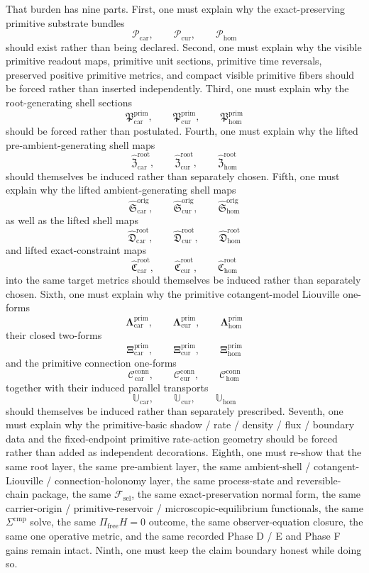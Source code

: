 \documentclass[11pt]{article}
\newcommand{\StemFunctional}{\mathscr F_{\mathrm{sel}}}
\newcommand{\TensorPrimitiveSpace}{\mathcal P_{\mathrm{car}}}
\newcommand{\CurPrimitiveSpace}{\mathcal P_{\mathrm{cur}}}
\newcommand{\HomPrimitiveSpace}{\mathcal P_{\mathrm{hom}}}
\newcommand{\TensorPrimitiveSection}{\mathfrak P_{\mathrm{car}}^{\mathrm{prim}}}
\newcommand{\CurPrimitiveSection}{\mathfrak P_{\mathrm{cur}}^{\mathrm{prim}}}
\newcommand{\HomPrimitiveSection}{\mathfrak P_{\mathrm{hom}}^{\mathrm{prim}}}
\newcommand{\TensorPrimitiveLiftedPreAmbientSection}{\widehat{\mathfrak Z}_{\mathrm{car}}^{\mathrm{root}}}
\newcommand{\CurPrimitiveLiftedPreAmbientSection}{\widehat{\mathfrak Z}_{\mathrm{cur}}^{\mathrm{root}}}
\newcommand{\HomPrimitiveLiftedPreAmbientSection}{\widehat{\mathfrak Z}_{\mathrm{hom}}^{\mathrm{root}}}
\newcommand{\TensorPrimitiveLiftedAmbientSection}{\widehat{\mathfrak S}_{\mathrm{car}}^{\mathrm{orig}}}
\newcommand{\CurPrimitiveLiftedAmbientSection}{\widehat{\mathfrak S}_{\mathrm{cur}}^{\mathrm{orig}}}
\newcommand{\HomPrimitiveLiftedAmbientSection}{\widehat{\mathfrak S}_{\mathrm{hom}}^{\mathrm{orig}}}
\newcommand{\TensorPrimitiveLiftedShellSection}{\widehat{\mathfrak D}_{\mathrm{car}}^{\mathrm{root}}}
\newcommand{\CurPrimitiveLiftedShellSection}{\widehat{\mathfrak D}_{\mathrm{cur}}^{\mathrm{root}}}
\newcommand{\HomPrimitiveLiftedShellSection}{\widehat{\mathfrak D}_{\mathrm{hom}}^{\mathrm{root}}}
\newcommand{\TensorPrimitiveConstraintMap}{\widehat{\mathfrak C}_{\mathrm{car}}^{\mathrm{root}}}
\newcommand{\CurPrimitiveConstraintMap}{\widehat{\mathfrak C}_{\mathrm{cur}}^{\mathrm{root}}}
\newcommand{\HomPrimitiveConstraintMap}{\widehat{\mathfrak C}_{\mathrm{hom}}^{\mathrm{root}}}
\newcommand{\TensorPrimitiveLiouville}{\boldsymbol{\Lambda}_{\mathrm{car}}^{\mathrm{prim}}}
\newcommand{\CurPrimitiveLiouville}{\boldsymbol{\Lambda}_{\mathrm{cur}}^{\mathrm{prim}}}
\newcommand{\HomPrimitiveLiouville}{\boldsymbol{\Lambda}_{\mathrm{hom}}^{\mathrm{prim}}}
\newcommand{\TensorPrimitiveTwo}{\boldsymbol{\Xi}_{\mathrm{car}}^{\mathrm{prim}}}
\newcommand{\CurPrimitiveTwo}{\boldsymbol{\Xi}_{\mathrm{cur}}^{\mathrm{prim}}}
\newcommand{\HomPrimitiveTwo}{\boldsymbol{\Xi}_{\mathrm{hom}}^{\mathrm{prim}}}
\newcommand{\TensorPrimitiveConnectionForm}{\mathcal C_{\mathrm{car}}^{\mathrm{conn}}}
\newcommand{\CurPrimitiveConnectionForm}{\mathcal C_{\mathrm{cur}}^{\mathrm{conn}}}
\newcommand{\HomPrimitiveConnectionForm}{\mathcal C_{\mathrm{hom}}^{\mathrm{conn}}}
\newcommand{\TensorPrimitiveTransport}{\mathbb U_{\mathrm{car}}}
\newcommand{\CurPrimitiveTransport}{\mathbb U_{\mathrm{cur}}}
\newcommand{\HomPrimitiveTransport}{\mathbb U_{\mathrm{hom}}}
\begin{document}
That burden has nine parts. First, one must explain why the exact-preserving primitive substrate bundles
\[
\TensorPrimitiveSpace,\qquad
\CurPrimitiveSpace,\qquad
\HomPrimitiveSpace
\]
should exist rather than being declared. Second, one must explain why the visible primitive readout maps, primitive unit sections, primitive time reversals, preserved positive primitive metrics, and compact visible primitive fibers should be forced rather than inserted independently. Third, one must explain why the root-generating shell sections
\[
\TensorPrimitiveSection,\qquad
\CurPrimitiveSection,\qquad
\HomPrimitiveSection
\]
should be forced rather than postulated. Fourth, one must explain why the lifted pre-ambient-generating shell maps
\[
\TensorPrimitiveLiftedPreAmbientSection,\qquad
\CurPrimitiveLiftedPreAmbientSection,\qquad
\HomPrimitiveLiftedPreAmbientSection
\]
should themselves be induced rather than separately chosen. Fifth, one must explain why the lifted ambient-generating shell maps
\[
\TensorPrimitiveLiftedAmbientSection,\qquad
\CurPrimitiveLiftedAmbientSection,\qquad
\HomPrimitiveLiftedAmbientSection
\]
as well as the lifted shell maps
\[
\TensorPrimitiveLiftedShellSection,\qquad
\CurPrimitiveLiftedShellSection,\qquad
\HomPrimitiveLiftedShellSection
\]
and lifted exact-constraint maps
\[
\TensorPrimitiveConstraintMap,\qquad
\CurPrimitiveConstraintMap,\qquad
\HomPrimitiveConstraintMap
\]
into the same target metrics should themselves be induced rather than separately chosen. Sixth, one must explain why the primitive cotangent-model Liouville one-forms
\[
\TensorPrimitiveLiouville,\qquad
\CurPrimitiveLiouville,\qquad
\HomPrimitiveLiouville
\]
their closed two-forms
\[
\TensorPrimitiveTwo,\qquad
\CurPrimitiveTwo,\qquad
\HomPrimitiveTwo
\]
and the primitive connection one-forms
\[
\TensorPrimitiveConnectionForm,\qquad
\CurPrimitiveConnectionForm,\qquad
\HomPrimitiveConnectionForm
\]
together with their induced parallel transports
\[
\TensorPrimitiveTransport,\qquad
\CurPrimitiveTransport,\qquad
\HomPrimitiveTransport
\]
should themselves be induced rather than separately prescribed. Seventh, one must explain why the primitive-basic shadow / rate / density / flux / boundary data and the fixed-endpoint primitive rate-action geometry should be forced rather than added as independent decorations. Eighth, one must re-show that the same root layer, the same pre-ambient layer, the same ambient-shell / cotangent-Liouville / connection-holonomy layer, the same process-state and reversible-chain package, the same \(\StemFunctional\), the same exact-preservation normal form, the same carrier-origin / primitive-reservoir / microscopic-equilibrium functionals, the same \(\Sigma^{\mathrm{cmp}}\) solve, the same \(\Pi_{\mathrm{free}}H=0\) outcome, the same observer-equation closure, the same one operative metric, and the same recorded Phase D / E and Phase F gains remain intact. Ninth, one must keep the claim boundary honest while doing so.
\end{document}
